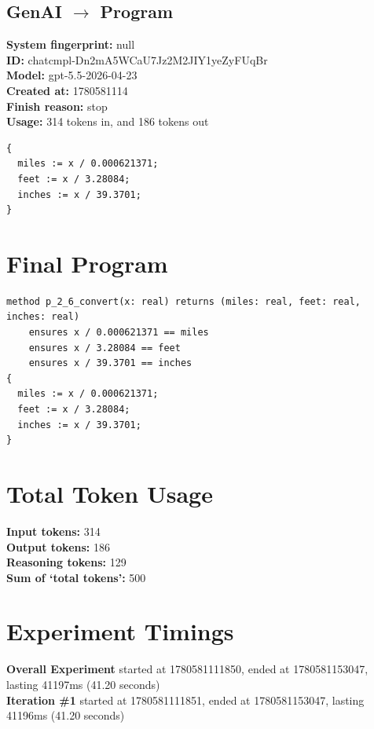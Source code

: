 \documentclass{article}
\begin{document}
\subsection*{GenAI $\rightarrow$ Program}
\textbf{System fingerprint: }null
\\\textbf{ID: }chatcmpl-Dn2mA5WCaU7Jz2M2JIY1yeZyFUqBr
\\\textbf{Model: }gpt-5.5-2026-04-23
\\\textbf{Created at: }1780581114
\\\textbf{Finish reason: }stop
\\\textbf{Usage: }314 tokens in, and 186 tokens out
\begin{lstlisting}
{
  miles := x / 0.000621371;
  feet := x / 3.28084;
  inches := x / 39.3701;
}
\end{lstlisting}
\section*{Final Program}
\begin{lstlisting}
method p_2_6_convert(x: real) returns (miles: real, feet: real, inches: real)
	ensures x / 0.000621371 == miles
	ensures x / 3.28084 == feet
	ensures x / 39.3701 == inches
{
  miles := x / 0.000621371;
  feet := x / 3.28084;
  inches := x / 39.3701;
}
\end{lstlisting}
\section*{Total Token Usage}
\textbf{Input tokens: }314
\\\textbf{Output tokens: }186
\\\textbf{Reasoning tokens: }129
\\\textbf{Sum of `total tokens': }500
\section*{Experiment Timings}
\textbf{Overall Experiment} started at 1780581111850, ended at 1780581153047, lasting 41197ms (41.20 seconds)
\\\textbf{Iteration \#1} started at 1780581111851, ended at 1780581153047, lasting 41196ms (41.20 seconds)
\end{document}
